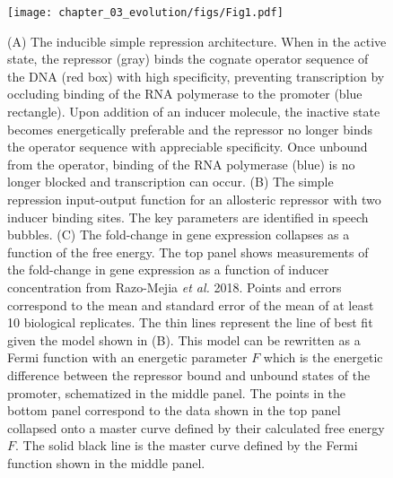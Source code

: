 \begin{figure}[h]
    \centering
    \texttt{[image: chapter\_03\_evolution/figs/Fig1.pdf]}
    \caption[A predictive framework for phenotypic and energetic dissection of
the simple repression motif.]{(A) The inducible simple repression
architecture. When in the active state, the repressor (gray) binds the
cognate operator sequence of the DNA (red box) with high specificity,
preventing transcription by occluding binding of the RNA polymerase to the
promoter (blue rectangle). Upon addition of an inducer molecule, the inactive
state becomes energetically preferable and the repressor no longer binds the operator
sequence with appreciable specificity. Once unbound from the operator,
binding of the RNA polymerase (blue) is no longer blocked and transcription
can occur. (B) The simple repression input-output function for an allosteric
repressor with two inducer binding sites. The key parameters are identified in
speech bubbles. (C) The fold-change in gene expression collapses as a function of
the free energy. The top panel shows measurements of the fold-change in gene
expression as a function of inducer concentration from Razo-Mejia \textit{et
al.} 2018. Points and errors correspond to the mean and standard error of the
mean of at
least 10 biological replicates. The thin lines represent the line of best fit
given the model shown in (B). This model can be rewritten as a Fermi function
with an energetic parameter $F$ which is the energetic difference between the
repressor bound and unbound states of the promoter, schematized in the middle
panel. The points in the bottom panel correspond to the data shown in the top
panel collapsed onto a master curve defined by their calculated free energy $F$.
The solid black line is the master curve defined by the Fermi function shown in
the middle panel.} 
\label{fig:induction_theory}
\end{figure}


